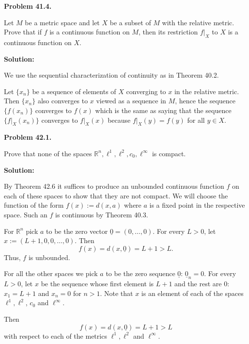 \documentclass[12pt]{article}
\def\black{\color{black}}
\def\green{\color{rltgreen}}
\renewcommand\|{\ | \ }
\newcommand\R{\mathbb{R}}
\def\pb#1{{\green \bf Problem #1.}\hskip 8pt \black}
\def\sol{\textbf{Solution:}}
\def\sequence#1{$\{{#1}_n\}$}
\begin{document}

\pb{41.4}

Let $M$ be a metric space and let $X$ be a subset of $M$ with the relative
metric. Prove that if $f$ is a continuous function on $M$, then its 
restriction $f|_{X}$ to $X$ is a continuous function on $X$.

\sol

We use the sequential characterization of continuity as in Theorem 40.2.

Let \sequence x be a sequence of elements of $X$ converging to $x$
in the relative metric. Then \sequence x also converges to $x$ viewed 
as a sequence in $M$, hence the sequence $\{f(x_n)\}$ converges to $f(x)$
which is the same as saying that the sequence $\{f|_{X}(x_n)\}$ converges
to $f|_{X}(x)$ because $f|_X(y) = f(y)$ for all $y \in X$.


\pb{42.1}

Prove that none of the spaces $\R^n, \ell^1, \ell^2, c_0, \ell^\infty$ is 
compact.

\sol

By Theorem 42.6 it suffices to produce an unbounded continuous function $f$ on 
each of these spaces to show that they are not compact. We will choose
the function of the form $f(x) := d(x, a)$ where $a$ is a fixed point in
the respective space. Such an $f$ is continuous by Theorem 40.3.

For $\R^n$ pick $a$ to be the zero vector $\underline 0 = (0, \ldots, 0)$.
For every $L > 0$, let $x := (L + 1, 0, 0, \ldots, 0)$. Then
\[
f(x) = d(x, \underline 0) = L + 1 > L.
\]
Thus, $f$ is unbounded.

For all the other spaces we pick $a$ to be the zero sequence $\underline 0$:
$\underline 0_n = 0$. For every $L > 0$, let $x$ be the sequence whose
first element is $L + 1$ and the rest are 0: $x_1 = L + 1$ and $x_n = 0$
for $n > 1$. Note that $x$ is an element of each of the spaces
$\ell^1, \ell^2$, $c_0$ and $\ell^\infty$.

Then 
\[
f(x) = d(x, \underline 0) = L + 1 > L
\]
with respect to each of the metrics $\ell^1, \ell^2$ and $\ell^\infty$.
\end{document}
